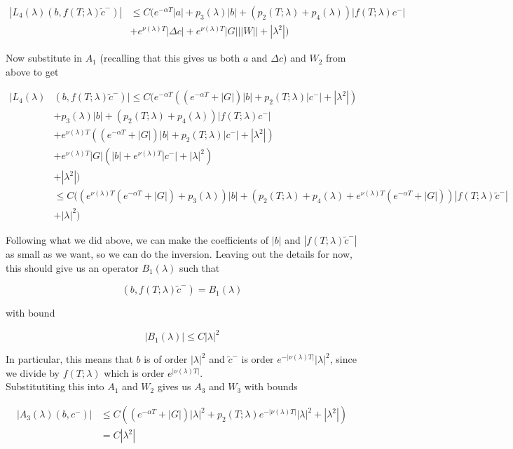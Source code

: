 \documentclass[12pt]{article}
\begin{document}
\begin{enumerate}
\begin{align*}
|L_4(\lambda)(b, f(T; \lambda) \tilde{c}^-)| &\leq C( e^{-\alpha T}|a| + p_3(\lambda)|b| + (p_2(T; \lambda) + p_4(\lambda)) |f(T; \lambda) c^-|  \\
&+ e^{\nu(\lambda)T}|\Delta c| + e^{\nu(\lambda)T}|G|||W|| + |\lambda^2|)
\end{align*}

Now substitute in $A_1$ (recalling that this gives us both $a$ and $\Delta c$) and $W_2$ from above to get

\begin{align*}
|L_4(\lambda)&(b, f(T; \lambda) \tilde{c}^-)| \leq C( e^{-\alpha T}((e^{-\alpha T} + |G|)|b| + p_2(T; \lambda)|c^-| + |\lambda^2|) \\
&+ p_3(\lambda)|b| + (p_2(T; \lambda) + p_4(\lambda)) |f(T; \lambda) c^-|  \\
&+ e^{\nu(\lambda)T}((e^{-\alpha T} + |G|)|b| + p_2(T; \lambda)|c^-| + |\lambda^2|) \\
&+ e^{\nu(\lambda)T} |G|(|b| + e^{\nu(\lambda)T}|c^-| + |\lambda|^2) \\
&+ |\lambda^2|)\\
&\leq C((e^{\nu(\lambda)T}(e^{-\alpha T} + |G|) + p_3(\lambda))|b| + (p_2(T; \lambda) + p_4(\lambda) + e^{\nu(\lambda)T}(e^{-\alpha T} + |G|))|f(T; \lambda) \tilde{c}^-| \\
&+ |\lambda|^2 )
\end{align*}

Following what we did above, we can make the coefficients of $|b|$ and $|f(T; \lambda) \tilde{c}^-|$ as small as we want, so we can do the inversion. Leaving out the details for now, this should give us an operator $B_1(\lambda)$ such that

\[
(b, f(T; \lambda) \tilde{c}^-) = B_1(\lambda)
\]

with bound

\[
|B_1(\lambda)| \leq C|\lambda|^2
\]

In particular, this means that $b$ is of order $|\lambda|^2$ and $\tilde{c}^-$ is order $e^{-|\nu(\lambda)T|} |\lambda|^2$, since we divide by $f(T; \lambda)$ which is order $e^{|\nu(\lambda)T|}$.\\

Substitutiting this into $A_1$ and $W_2$ gives us $A_3$ and $W_3$ with bounds

\begin{align*}
|A_3(\lambda)(b, c^-)| &\leq C ( (e^{-\alpha T} + |G|)|\lambda|^2 + p_2(T; \lambda)e^{-|\nu(\lambda)T|} |\lambda|^2 + |\lambda^2|) \\
&= C |\lambda^2|
\end{align*}


\end{enumerate}
\end{document}
